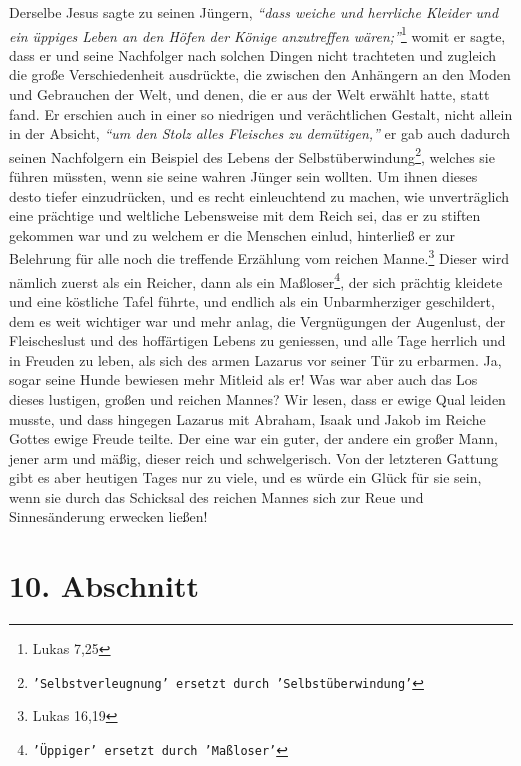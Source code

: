 Derselbe Jesus sagte
zu seinen Jüngern,
\textit{"`dass weiche und herrliche Kleider und ein üppiges Leben an
den Höfen der Könige anzutreffen wären;"'}\footnote{Lukas 7,25}
womit er sagte,
dass er und seine Nachfolger nach solchen Dingen nicht trachteten und zugleich
die große Verschiedenheit ausdrückte, die zwischen den Anhängern an den Moden
und Gebrauchen der Welt, und denen, die er aus der Welt erwählt hatte, statt
fand. Er erschien auch in einer so niedrigen und verächtlichen Gestalt, nicht
allein in der Absicht,
\textit{"`um den Stolz alles Fleisches zu demütigen,"'} er gab
auch dadurch seinen Nachfolgern ein Beispiel des Lebens der
Selbstüberwindung\footnote{\texttt{'Selbstverleugnung' ersetzt durch
'Selbstüberwindung'}},
welches sie führen müssten, wenn sie seine wahren Jünger sein wollten. Um ihnen
dieses desto tiefer einzudrücken, und es recht einleuchtend zu machen, wie
unverträglich eine prächtige und weltliche Lebensweise mit dem Reich sei, das
er zu stiften gekommen war und zu welchem er die Menschen einlud, hinterließ
er zur Belehrung für alle noch die treffende Erzählung vom reichen
Manne.\footnote{Lukas 16,19}
Dieser wird nämlich zuerst als ein Reicher, dann als
ein Maßloser\footnote{\texttt{'Üppiger' ersetzt durch 'Maßloser'}}, der sich
prächtig
kleidete und eine köstliche Tafel führte, und
endlich als ein Unbarmherziger geschildert, dem es weit wichtiger war und mehr
anlag, die Vergnügungen der Augenlust, der Fleischeslust und des hoffärtigen
Lebens zu geniessen, und alle Tage herrlich und in Freuden zu leben, als sich
des
armen Lazarus vor seiner Tür zu erbarmen. Ja, sogar
seine Hunde
bewiesen mehr
Mitleid als er! Was war aber auch das Los dieses lustigen, großen
und reichen
Mannes? Wir lesen, dass er ewige Qual leiden musste, und dass
hingegen Lazarus mit
Abraham, Isaak und
Jakob
im Reiche Gottes ewige Freude teilte. Der eine war ein
guter, der andere ein großer Mann, jener arm und mäßig, dieser reich und
schwelgerisch. Von der letzteren Gattung gibt es aber heutigen Tages nur zu
viele, und es würde ein Glück für sie sein, wenn sie durch das Schicksal des
reichen Mannes sich zur Reue und Sinnesänderung erwecken ließen!

\section{10. Abschnitt} \label{kap14_ab10}

